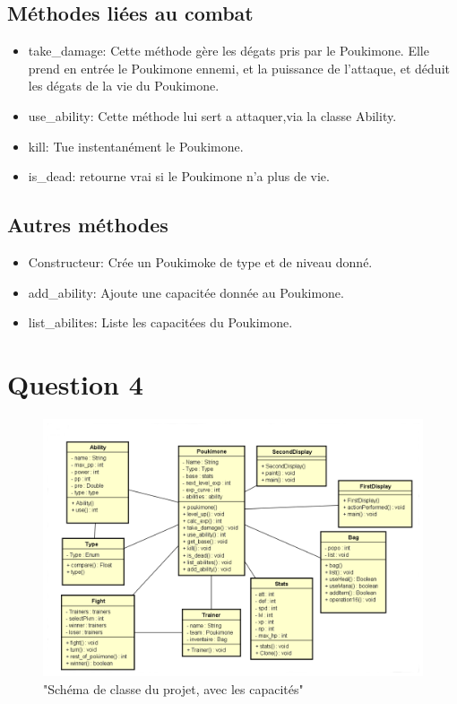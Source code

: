 \documentclass{report}
\begin{document}
\subsection*{Méthodes liées au combat}
\begin{itemize}
    \item{take\_damage:}
        Cette méthode gère les dégats pris par le Poukimone. Elle prend en entrée le Poukimone ennemi, et la puissance de l'attaque, et déduit les dégats de la vie du Poukimone.\\
    \item{use\_ability:}
        Cette méthode lui sert a attaquer,via la classe Ability.\\
    \item{kill:}
        Tue instentanément le Poukimone.\\
    \item{is\_dead:}
        retourne vrai si le Poukimone n'a plus de vie.
\end{itemize}
\subsection*{Autres méthodes}
\begin{itemize}
    \item{Constructeur:}
        Crée un Poukimoke de type et de niveau donné.\\
    \item{add\_ability:}
        Ajoute une capacitée donnée au Poukimone.\\
    \item{list\_abilites:}
        Liste les capacitées du Poukimone.
\end{itemize}
\section*{Question 4}
\begin{figure}[ht!]
    \centering
    \includegraphics[width=125mm]{Q4.png}
    \caption{"Schéma de classe du projet, avec les capacités"}
\end{figure}
\end{document}
